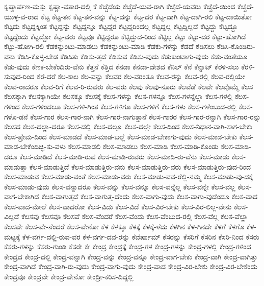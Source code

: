 {ಕೃಷ್ಣಾರ್ಪಣ-ಮಸ್ತು
ಕೃಷ್ಣಾ-ವತಾರ-ದಲ್ಲಿ
ಕೆ
ಕೆಚ್ಚೆದೆಯ
ಕೆಚ್ಚೆದೆ-ಯವ-ರಾಗಿ
ಕೆಚ್ಚೆದೆ-ಯವರು
ಕೆಚ್ಚೆದೆ-ಯಿಂದ
ಕೆಚ್ಚೆದೆ-ಯುಳ್ಳ-ವ-ರಾದ
ಕೆಟ್ಟ
ಕೆಟ್ಟ-ತನ
ಕೆಟ್ಟ-ತನ-ವನ್ನು
ಕೆಟ್ಟ-ದನ್ನು
ಕೆಟ್ಟ-ದರ
ಕೆಟ್ಟ-ದಾಗಿ
ಕೆಟ್ಟ-ದಾಗಿ-ರಲಿ
ಕೆಟ್ಟ-ದಾಯಿತೋ
ಕೆಟ್ಟದು
ಕೆಟ್ಟದ್ದಕ್ಕಿಂತ
ಕೆಟ್ಟದ್ದನ್ನು
ಕೆಟ್ಟದ್ದನ್ನೂ
ಕೆಟ್ಟದ್ದರ
ಕೆಟ್ಟದ್ದರಿಂದಲ್ಲ
ಕೆಟ್ಟದ್ದಲ್ಲ
ಕೆಟ್ಟದ್ದಿಲ್ಲದೆ
ಕೆಟ್ಟದ್ದು
ಕೆಟ್ಟದ್ದೂ
ಕೆಟ್ಟದ್ದೆಂದು
ಕೆಟ್ಟದ್ದೋ
ಕೆಟ್ಟ-ವರು
ಕೆಟ್ಟವೂ
ಕೆಟ್ಟಿದ್ದರೂ
ಕೆಟ್ಟಿದ್ದುದ-ರಿಂದ
ಕೆಟ್ಟಿಲ್ಲ
ಕೆಟ್ಟು
ಕೆಟ್ಟು-ದರ
ಕೆಟ್ಟು-ಹೋಗಿದೆ
ಕೆಟ್ಟು-ಹೋಗಿ-ರಲಿ
ಕೆಡಕನ್ನುಂಟು-ಮಾಡಲು
ಕೆಡಕನ್ನುಂಟು-ಮಾಡಿ
ಕೆಡಕು-ಗಳನ್ನು
ಕೆಡದೆ
ಕೆಡಿಸಲು
ಕೆಡಿಸಿ-ಕೊಂಡಿರು-ವನು
ಕೆಡಿಸಿ-ಕೊಳ್ಳ-ಬೇಡ
ಕೆಡಿಸಿತು
ಕೆಡಿಸು-ತ್ತದೆ
ಕೆಡಿಸುವ
ಕೆಡಿಸು-ವುದು
ಕೆಡುಕುಂಟಾಗು-ವುದು
ಕೆಡು-ವಂತೆಯೂ
ಕೆಡು-ವುದು
ಕೆಣಕ-ಬೇಕೆಂದಿರು-ವೆನು
ಕೆತ್ತನೆ
ಕೆತ್ತಿದ
ಕೆನಡಾ
ಕೆನಡಾ-ದೇಶದ
ಕೆನಿಲ್
ಕೆನೆ
ಕೆನ್ನಾಟ್
ಕೆರಳಿ-ಸಲು
ಕೆರಳಿ-ಸುವುದ-ರಿಂದ
ಕೆರೆ-ದರೆ
ಕೆಲ-ಕಾಲ
ಕೆಲ-ವನ್ನು
ಕೆಲವರ
ಕೆಲ-ವರಂತೂ
ಕೆಲವ-ರನ್ನು
ಕೆಲವ-ರಲ್ಲಿ
ಕೆಲವ-ರಲ್ಲಿಯೇ
ಕೆಲವ-ರಾದರೂ
ಕೆಲವ-ರಿಗೆ
ಕೆಲವ-ರಿ-ರುವರು
ಕೆಲ-ವರು
ಕೆಲವು
ಕೆಲವು-ನೂರು
ಕೆಲವೆಡೆ
ಕೆಲವೇ
ಕೆಲವೊಮ್ಮೆ
ಕೆಲಸ
ಕೆಲಸಕ್ಕಾಗಿ
ಕೆಲಸಕ್ಕಾಗಿಯೇ
ಕೆಲಸಕ್ಕೂ
ಕೆಲಸಕ್ಕೆ
ಕೆಲಸ-ಗಳನ್ನು
ಕೆಲಸ-ಗಳನ್ನೂ
ಕೆಲಸ-ಗಳನ್ನೆಲ್ಲಾ
ಕೆಲಸ-ಗಳಲ್ಲಿ
ಕೆಲಸ-ಗಳಿಂದ
ಕೆಲಸ-ಗಳಿಂದಲೂ
ಕೆಲಸ-ಗಳಿ-ಗಿಂತ
ಕೆಲಸ-ಗಳಿಗೂ
ಕೆಲಸ-ಗಳಿಗೆ
ಕೆಲಸ-ಗಳು
ಕೆಲಸ-ಗಳೆಂಬುದ-ರಲ್ಲಿ
ಕೆಲಸ-ಗಳೊ-ಡನೆ
ಕೆಲಸ-ಗಾರ
ಕೆಲಸ-ಗಾರ-ನಾಗಿ
ಕೆಲಸ-ಗಾರ-ನಾಗುತ್ತಾನೆ
ಕೆಲಸ-ಗಾರರ
ಕೆಲಸ-ಗಾರ-ರನ್ನಾಗಿ
ಕೆಲಸ-ಗಾರ-ರನ್ನು
ಕೆಲಸದ
ಕೆಲಸ-ದಲ್ಲಾ-ದರೂ
ಕೆಲಸ-ದಲ್ಲಿ
ಕೆಲಸ-ದಲ್ಲೂ
ಕೆಲಸ-ದಲ್ಲೇ
ಕೆಲಸ-ದಿಂದ
ಕೆಲಸ-ನಿಧಾನ-ವಾಗಿ-ಸಾಗ-ಬೇಕು
ಕೆಲಸ-ಪ್ರೇಮ-ದಿಂದ
ಕೆಲಸ-ಮಾಡದೆ
ಕೆಲಸ-ಮಾಡ-ಬಲ್ಲೆ
ಕೆಲಸ-ಮಾಡ-ಬೇಕಾಗು-ವುದು
ಕೆಲಸ-ಮಾಡ-ಬೇಕು
ಕೆಲಸ-ಮಾಡ-ಬೇಕೆಂದಿಚ್ಛಿ-ಸು-ವಳು
ಕೆಲಸ-ಮಾಡಲಿ
ಕೆಲಸ-ಮಾಡಲು
ಕೆಲಸ-ಮಾಡಿ
ಕೆಲಸ-ಮಾಡಿ-ಕೊಂಡು
ಕೆಲಸ-ಮಾಡಿ-ದರೂ
ಕೆಲಸ-ಮಾಡಿದೆ
ಕೆಲಸ-ಮಾಡಿ-ರುವ
ಕೆಲಸ-ಮಾಡಿ-ರುವರು
ಕೆಲಸ-ಮಾಡಿ-ರು-ವೆನು
ಕೆಲಸ-ಮಾಡು
ಕೆಲಸ-ಮಾಡುತ್ತಾ
ಕೆಲಸ-ಮಾಡುತ್ತಿದೆ
ಕೆಲಸ-ಮಾಡುತ್ತಿರು-ವನು
ಕೆಲಸ-ಮಾಡುತ್ತಿರು-ವರು
ಕೆಲಸ-ಮಾಡುತ್ತಿರು-ವುದ-ರಿಂದ
ಕೆಲಸ-ಮಾಡುವ
ಕೆಲಸ-ಮಾಡು-ವಂತೆ
ಕೆಲಸ-ಮಾಡು-ವರು
ಕೆಲಸ-ಮಾಡು-ವವ-ರೆಲ್ಲಿ-ನಮ್ಮ
ಕೆಲಸ-ಮಾಡು-ವು-ದಕ್ಕೆ
ಕೆಲಸ-ಮಾಡು-ವುದು
ಕೆಲಸ-ವನ್ನಾದರೂ
ಕೆಲಸ-ವನ್ನು
ಕೆಲಸ-ವನ್ನೂ
ಕೆಲಸ-ವನ್ನೆಲ್ಲ
ಕೆಲಸ-ವನ್ನೇ
ಕೆಲಸ-ವಲ್ಲ
ಕೆಲಸ-ವಾಗ-ಬೇಕಾಗಿದೆ
ಕೆಲಸ-ವಾಗುತ್ತದೆ
ಕೆಲಸ-ವಾಗುತ್ತ-ದೆಂದು
ಕೆಲಸ-ವಾಗು-ವುದು
ಕೆಲಸ-ವಾಗು-ವುದೆಂದೂ
ಕೆಲಸ-ವಾದ
ಕೆಲಸ-ವಾದ-ಮೇಲೆ
ಕೆಲಸ-ವಾದರೋ
ಕೆಲಸ-ವಿದು
ಕೆಲಸ-ವಿದೆ
ಕೆಲಸ-ವಿರ-ಬೇಕು
ಕೆಲಸ-ವಿರ-ಲಿಲ್ಲ-ವೇನು
ಕೆಲಸ-ವಿಲ್ಲದೆ
ಕೆಲಸವು
ಕೆಲಸವೂ
ಕೆಲಸವೆ
ಕೆಲಸ-ವೆಂದರೆ
ಕೆಲಸ-ವೆಂದು
ಕೆಲಸ-ವೆಂಬುದ-ರಲ್ಲಿ
ಕೆಲಸ-ವೆಲ್ಲ
ಕೆಲಸ-ವೆಲ್ಲಾ
ಕೆಲಸವೇ
ಕೆಲಸ-ವೇ-ನೆಂದರೆ
ಕೆಲಸ-ವೇನೋ
ಕೆಳ
ಕೆಳಕ್ಕೂ
ಕೆಳಕ್ಕೆ
ಕೆಳಕ್ಕೆ-ಳೆದು
ಕೆಳಗಿನ
ಕೆಳ-ಗಿನದೇ
ಕೆಳಗೆ
ಕೆಳಗೊ
ಕೆಳ-ಮಟ್ಟಕ್ಕೆ
ಕೆಳ-ವರ್ಗ-ದಲ್ಲಿ-ರುವ-ವರ
ಕೆಳ-ವರ್ಗ-ದವ-ರನ್ನು
ಕೆವೆರ್ಷಾಮ್
ಕೆಸರನ್ನು
ಕೆಸರಿಗೆ
ಕೆಸರಿನ
ಕೆಸರಿ-ನಿಂದ
ಕೆಸರು
ಕೆಸರು-ಗಳನ್ನು
ಕೆಸರು-ಗುಂಡಿ
ಕೆಸರೇ
ಕೇ
ಕೇಂದ್ರ
ಕೇಂದ್ರಕ್ಕೆ
ಕೇಂದ್ರ-ಗಳ
ಕೇಂದ್ರ-ಗಳನ್ನು
ಕೇಂದ್ರ-ಗಳಲ್ಲಿ
ಕೇಂದ್ರ-ಗಳಿಂದ
ಕೇಂದ್ರದ
ಕೇಂದ್ರ-ದಲ್ಲಿ
ಕೇಂದ್ರ-ವನ್ನಾಗಿ
ಕೇಂದ್ರ-ವನ್ನು
ಕೇಂದ್ರ-ವನ್ನೂ
ಕೇಂದ್ರ-ವಾಗ-ಬೇಕು
ಕೇಂದ್ರ-ವಾಗಿ
ಕೇಂದ್ರ-ವಾಗಿತ್ತು
ಕೇಂದ್ರ-ವಾಗಿದೆ
ಕೇಂದ್ರ-ವಾಗಿ-ರು-ವುದು
ಕೇಂದ್ರ-ವಾಗು-ವುದು
ಕೇಂದ್ರ-ವಾದ
ಕೇಂದ್ರ-ವಿರ-ಬೇಕು
ಕೇಂದ್ರ-ವಿರ-ಬೇಕೆಂದು
ಕೇಂದ್ರವೂ
ಕೇಂದ್ರವೇ
ಕೇಂದ್ರ-ವೇನೋ
ಕೇಂದ್ರೀ-ಕರಿಸ-ದಿದ್ದಲ್ಲಿ
}
